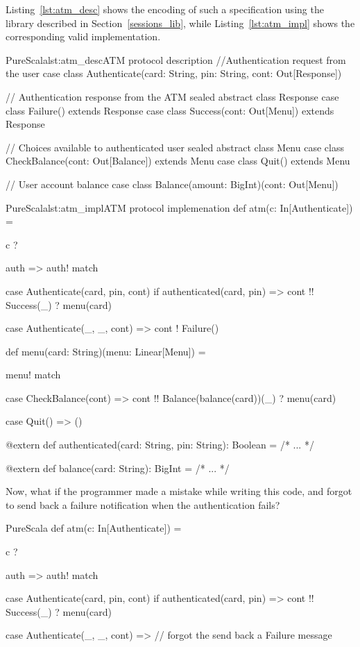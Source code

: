 \documentclass[a4paper,twoside]{article}
\newcommand{\RefSec}[1]{Section~\ref{#1}}
\newcommand{\RefCode}[1]{Listing~\ref{#1}}
\begin{document}
\RefCode{lst:atm_desc} shows the encoding of such a specification using the library described in \RefSec{sessions_lib}, while \RefCode{lst:atm_impl} shows the corresponding valid implementation.

\begin{Code}{PureScala}{lst:atm_desc}{ATM protocol description}
//Authentication request from the user
case class Authenticate(card: String, pin: String, cont: Out[Response])

// Authentication response from the ATM
sealed abstract class Response
case class Failure()                extends Response
case class Success(cont: Out[Menu]) extends Response

// Choices available to authenticated user
sealed abstract class Menu
case class CheckBalance(cont: Out[Balance]) extends Menu
case class Quit()                           extends Menu

// User account balance
case class Balance(amount: BigInt)(cont: Out[Menu])
\end{Code}

\begin{Code}{PureScala}{lst:atm_impl}{ATM protocol implemenation}
def atm(c: In[Authenticate]) = {
  c ? { auth => auth! match {  
    case Authenticate(card, pin, cont) if authenticated(card, pin) =>
      cont !! Success(_) ? menu(card)
  
    case Authenticate(_, _, cont)  =>
      cont ! Failure()
  } }
}

def menu(card: String)(menu: Linear[Menu]) = {
  menu! match {
    case CheckBalance(cont) =>
      cont !! Balance(balance(card))(_) ? menu(card)

    case Quit() => ()
  }
}

@extern
def authenticated(card: String, pin: String): Boolean = {
  /* ... */
}

@extern
def balance(card: String): BigInt = {
  /* ... */
}
\end{Code}

Now, what if the programmer made a mistake while writing this code, and forgot to send back a failure notification when the authentication fails?

\begin{ShortCode}{PureScala}
def atm(c: In[Authenticate]) = {
  c ? { auth => auth! match {  
    case Authenticate(card, pin, cont) if authenticated(card, pin) =>
      cont !! Success(_) ? menu(card)
  
    case Authenticate(_, _, cont)  =>
      // forgot the send back a Failure message
  } }
}
\end{ShortCode}
\end{document}
